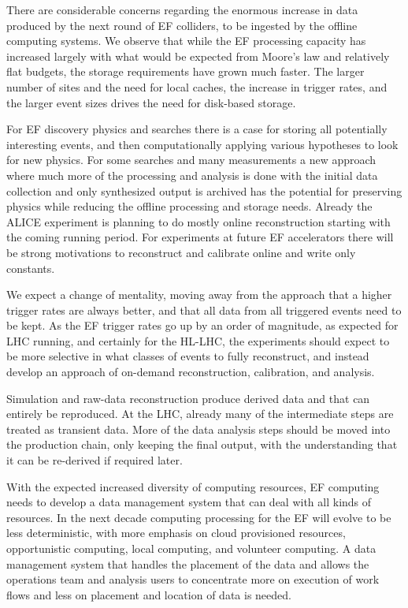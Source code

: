 There are considerable concerns regarding the enormous increase 
in data produced by the next round of EF colliders,  
to be ingested by the offline computing systems. 
We observe that while
the EF processing capacity has increased largely with what would be expected from
Moore's law and relatively flat budgets, the storage requirements have
grown much faster.  The larger number of sites and the need for local
caches, the increase in trigger rates, and the larger event sizes
drives the need for disk-based storage.  

For EF discovery physics and searches there is a case for storing
all potentially interesting events, and then computationally 
applying various hypotheses to look
for new physics.  For some searches and many measurements a new approach
where much more of the processing and analysis is done with the
initial data collection and only synthesized output is archived has
the potential for preserving physics while reducing the offline
processing and storage needs.  Already the ALICE experiment is
planning to do mostly online reconstruction starting with 
the coming running period.  
For experiments at future EF accelerators there will be strong
motivations to reconstruct and calibrate online and write only
constants.

We expect a change of mentality, moving away from the approach 
that a higher trigger rates are always better, and that all data from 
all triggered events need to be kept.  
As the EF trigger rates go up by an order of magnitude, 
as expected for LHC running, and certainly for the HL-LHC, 
the experiments should expect to be more
selective in what classes of events to fully reconstruct, 
and instead develop an approach of on-demand reconstruction, calibration, and
analysis.

Simulation and raw-data reconstruction produce 
derived data and that can entirely be reproduced. At the LHC, already many of the
intermediate steps are treated as transient data.  
More of the data analysis steps should be moved into the production
chain, only keeping the final output, with the understanding that it can be
re-derived if required later.

With the expected increased diversity of computing resources, EF
computing needs to develop a data management system that can deal with
all kinds of resources.  
In the
next decade computing processing for the EF will evolve
to be less deterministic, with more emphasis on cloud provisioned
resources, opportunistic computing, local computing, and volunteer
computing.  
A data management system that handles the placement of the data and
allows the operations team and analysis users to concentrate more on
execution of work flows and less on placement and location of data is
needed.  

